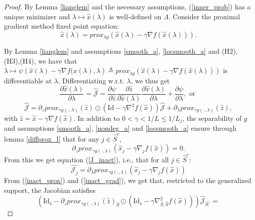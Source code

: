 \documentclass[11pt, twoside]{report}
\begin{document}
\begin{proof}
By Lemma \ref{lianglem} and the necessary assumptions, (\ref{inner_prob}) has a unique minimizer and $\lambda \mapsto \hat{x}(\lambda)$ is well-defined on $\Lambda$. Consider the proximal gradient method fixed point equation:
\begin{equation} \label{fpe}
    \hat{x}(\lambda) = prox_{\lambda g} \left(\hat{x}(\lambda) - \gamma \nabla f(\hat{x}(\lambda))\right).
\end{equation}

By Lemma \ref{lianglem} and assumptions \ref{smooth_a}, \ref{locsmooth_a} and (H2),(H3),(H4), we have that $\lambda \mapsto \psi \left( \hat{x}(\lambda) - \gamma \nabla f(\hat{x}(\lambda), \lambda\right) \triangleq prox_{\lambda g} \left(\hat{x}(\lambda) - \gamma \nabla f(\hat{x}(\lambda))\right)$ is differentiable at $\lambda$. Differentiating w.r.t. $\lambda$, we thus get
\[\frac{\partial\hat{x}(\lambda)}{\partial\lambda} = \hat{\mathcal{J}} = \frac{\partial \psi}{\partial \hat{z}} \frac{\partial \hat{z}}{\partial \hat{x}(\lambda)} \frac{\partial \hat{x}(\lambda)}{\partial \lambda} + \frac{\partial \psi}{\partial  \lambda}, \text{ or }\]
\begin{equation} \label{fpe_diff}
    \hat{\mathcal{J}} = \partial_z prox_{\gamma g(\cdot,\lambda)}(\hat{z}) \odot \left( \mathrm{Id} - \gamma \nabla^2 f(\hat{x})\right) \hat{\mathcal{J}} + \partial_\lambda prox_{\gamma g(\cdot,\lambda)}(\hat{z}),
\end{equation}
with $\hat{z} = \hat{x} - \gamma \nabla f(\hat{x})$. In addition to $0 < \gamma < 1/L \leq 1/L_j$, the separability of $g$ and assumptions \ref{smooth_a},  \ref{nondeg_a} and \ref{locsmooth_a} ensure through lemma \ref{diffprox_l} that for any $j \in \hat{S}^c$,
\begin{equation} \label{inact_prox}
    \partial_z prox_{\gamma g(\cdot,\lambda)}(\hat{x}_j - \gamma \nabla_j f(\hat{x})) = 0.
\end{equation}
From this we get equation (\ref{J_inact}), i.e., that for all $j \in \hat{S}^c$:
\begin{equation} \label{inact_grad}
    \hat{\mathcal{J}_j} = \partial_\lambda prox_{\gamma g(\cdot,\lambda)}(\hat{x}_j - \gamma \nabla_j f(\hat{x}))
\end{equation}
From (\ref{inact_prox}) and (\ref{inact_grad}), we get that, restricted to the generalized support, the Jacobian satisfies
\begin{equation} \label{act_grad}
    \left( \mathrm{Id}_{\hat{s}} - \partial_z prox_{\gamma g(\cdot,\lambda)}(\hat{z})_{\hat{S}} \odot (\mathrm{Id}_{\hat{s}} - \gamma \nabla^2_{\hat{S},\hat{S}} f(\hat{x}))\right) \hat{\mathcal{J}}_{\hat{S:}} = 

\end{equation}
\end{proof}
\end{document}
